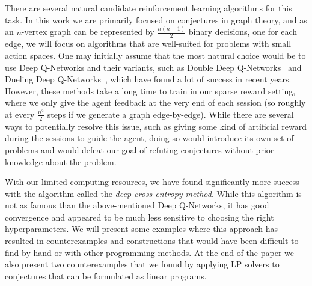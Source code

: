 \documentclass[11pt,english]{article}
\theoremstyle{plain}
\theoremstyle{remark}
\begin{document}
There are several natural candidate reinforcement learning algorithms for this task. In this work we are primarily focused on conjectures in graph theory, and as an $n$-vertex graph can be represented by $\frac{n(n-1)}{2}$ binary decisions, one for each edge, we will focus on algorithms that are well-suited for problems with small action spaces. One may initially assume that the most natural choice would be to use Deep Q-Networks and their variants, such as Double Deep Q-Networks~\cite{double} and Dueling Deep Q-Networks~\cite{dueling}, which have found a lot of success in recent years. However, these methods take a long time to train in our sparse reward setting, where we only give the agent feedback at the very end of each session (so roughly at every $\frac{n^2}{2}$ steps if we generate a graph edge-by-edge). While there are several  ways to potentially resolve this issue, such as giving some kind of artificial reward during the sessions to guide the agent, doing so would introduce its own set of problems and would defeat our goal of refuting conjectures without prior knowledge about the problem.

With our limited computing resources, we have found significantly more success with the algorithm called the \emph{deep cross-entropy method}. While this algorithm is not as famous than the above-mentioned Deep Q-Networks, it has good convergence and appeared to be much less sensitive to choosing the right hyperparameters. We will present some examples where this approach has resulted in counterexamples and constructions that would have been difficult to find by hand or with other programming methods. At the end of the paper we also present two counterexamples that we found by applying LP solvers to conjectures that can be formulated as linear programs.
\end{document}
